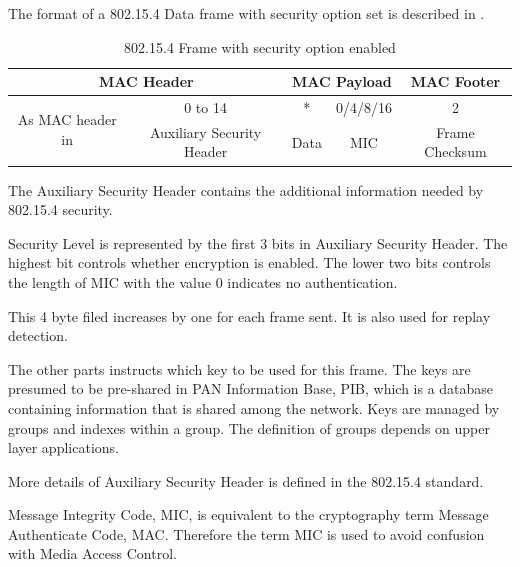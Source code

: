 The format of a 802.15.4 Data frame with security option set is described in .

\begin{table}[h!]
	\centering
	\begin{tabular}{|c|c|c|c|c|c|c|}
		\hline
		\multicolumn{4}{|c|}{MAC Header}                                                             & \multicolumn{2}{c|}{MAC Payload} & MAC Footer     \\ \hline
		\multicolumn{3}{|c|}{\multirow{2}{*}{As MAC header in \Cref{Tbl: 802154 frame}}} & 0 to 14                    & *             & 0/4/8/16         & 2              \\ \cline{4-7} 
		\multicolumn{3}{|c|}{}                                           & Auxiliary Security Header & Data          & MIC              & Frame Checksum \\ \hline
	\end{tabular}
	\caption{802.15.4 Frame with security option enabled} \label{Tbl: 802154 sec frame}
\end{table}

The Auxiliary Security Header contains the additional information needed by 802.15.4 security.

\begin{description}[style=nextline]
	\item[\textbf{Security Level}]
	Security Level is represented by the first 3 bits in Auxiliary Security Header. The highest bit controls whether encryption is enabled. The lower two bits controls the length of MIC with the value $0$ indicates no authentication.
	\item[\textbf{Frame Counter}]
	This 4 byte filed increases by one for each frame sent. It is also used for replay detection.
	\item[\textbf{Key Strategy}]
	The other parts instructs which key to be used for this frame. The keys are presumed to be pre-shared in PAN Information Base, PIB, which is a database containing information that is shared among the network. Keys are managed by groups and indexes within a group. The definition of groups depends on upper layer applications.
\end{description}

More details of Auxiliary Security Header is defined in the 802.15.4 standard.

Message Integrity Code, MIC, is equivalent to the cryptography term Message Authenticate Code, MAC. Therefore the term MIC is used to avoid confusion with Media Access Control.

